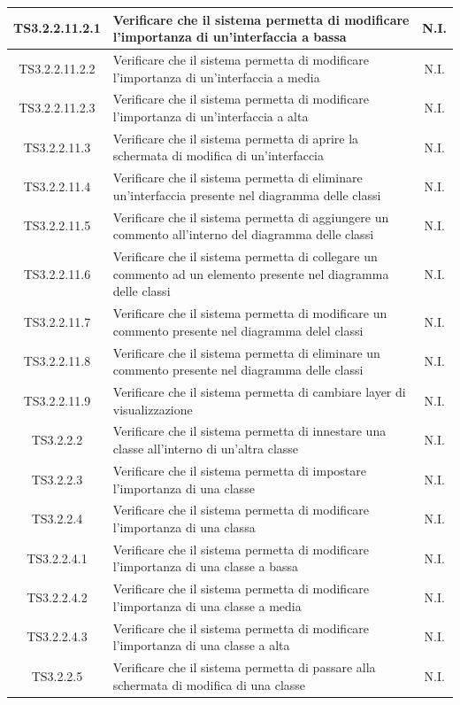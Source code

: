 \documentclass[../PianoDiQualifica.tex]{subfiles}
\begin{document}
\begin{longtable}{|c|>{\centering}p{10cm}|c|}
	TS3.2.2.11.2.1 & Verificare che il sistema permetta di modificare l'importanza di un'interfaccia a bassa & N.I. \\
	\hline
	TS3.2.2.11.2.2 & Verificare che il sistema permetta di modificare l'importanza di un'interfaccia a media & N.I. \\
	\hline
	TS3.2.2.11.2.3 & Verificare che il sistema permetta di modificare l'importanza di un'interfaccia a alta & N.I. \\
	\hline
	TS3.2.2.11.3 & Verificare che il sistema permetta di aprire la schermata di modifica di un'interfaccia & N.I. \\
	\hline
	TS3.2.2.11.4 & Verificare che il sistema permetta di eliminare un'interfaccia presente nel diagramma delle classi & N.I. \\
	\hline
	TS3.2.2.11.5 & Verificare che il sistema permetta di aggiungere un commento all'interno del diagramma delle classi & N.I. \\
	\hline
	TS3.2.2.11.6 & Verificare che il sistema permetta di collegare un commento ad un elemento presente nel diagramma delle classi & N.I. \\
	\hline
	TS3.2.2.11.7 & Verificare che il sistema permetta di modificare un commento presente nel diagramma delel classi & N.I. \\
	\hline
	TS3.2.2.11.8 & Verificare che il sistema permetta di eliminare un commento presente nel diagramma delle classi & N.I. \\
	\hline
	TS3.2.2.11.9 & Verificare che il sistema permetta di cambiare layer di visualizzazione & N.I. \\
	\hline
	TS3.2.2.2 & Verificare che il sistema permetta di innestare una classe all'interno di un'altra classe & N.I. \\
	\hline
	TS3.2.2.3 & Verificare che il sistema permetta di impostare l'importanza di una classe & N.I. \\
	\hline
	TS3.2.2.4 & Verificare che il sistema permetta di modificare l'importanza di una classa & N.I. \\
	\hline
	TS3.2.2.4.1 & Verificare che il sistema permetta di modificare l'importanza di una classe a bassa & N.I. \\
	\hline
	TS3.2.2.4.2 & Verificare che il sistema permetta di modificare l'importanza di una classe a media & N.I. \\
	\hline
	TS3.2.2.4.3 & Verificare che il sistema permetta di modificare l'importanza di una classe a alta & N.I. \\
	\hline
	TS3.2.2.5 & Verificare che il sistema permetta di passare alla schermata di modifica di una classe & N.I. \\

\end{longtable}
\end{document}
